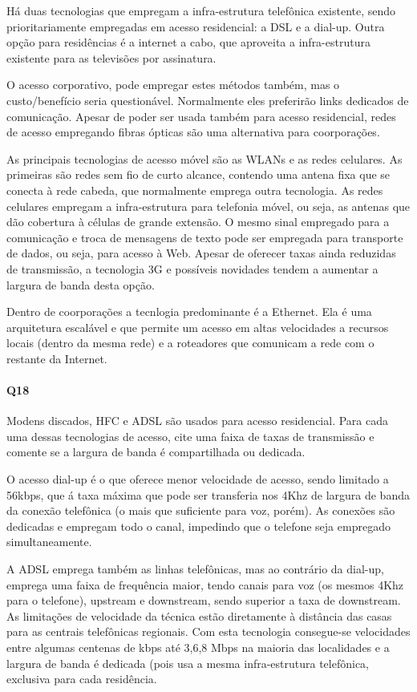 Há duas tecnologias que empregam a infra-estrutura telefônica existente, sendo prioritariamente empregadas em acesso residencial: a DSL e a dial-up.
Outra opção para residências é a internet a cabo, que aproveita a infra-estrutura existente para as televisões por assinatura.

O acesso corporativo, pode empregar estes métodos também, mas o custo/benefício seria questionável.
Normalmente eles preferirão links dedicados de comunicação.
Apesar de poder ser usada também para acesso residencial, redes de acesso empregando fibras ópticas são uma alternativa para coorporações.

As principais tecnologias de acesso móvel são as WLANs e as redes celulares.
As primeiras são redes sem fio de curto alcance, contendo uma antena fixa que se conecta à rede cabeda, que normalmente emprega outra tecnologia.
As redes celulares empregam a infra-estrutura para telefonia móvel, ou seja, as antenas que dão cobertura à células de grande extensão.
O mesmo sinal empregado para a comunicação e troca de mensagens de texto pode ser empregada para transporte de dados, ou seja, para acesso à Web.
Apesar de oferecer taxas ainda reduzidas de transmissão, a tecnologia 3G e possíveis novidades tendem a aumentar a largura de banda desta opção.

Dentro de coorporações a tecnlogia predominante é a Ethernet. Ela é uma arquitetura escalável e que permite um acesso em altas velocidades a recursos locais (dentro da mesma rede) e a roteadores que comunicam a rede com o restante da Internet.


\paragraph{Q18}
Modens discados, HFC e ADSL são usados para acesso residencial. Para cada uma dessas tecnologias de acesso, cite uma faixa de taxas de transmissão e comente se a largura de banda é compartilhada ou dedicada.

O acesso dial-up é o que oferece menor velocidade de acesso, sendo limitado a 56kbps, que á taxa máxima que pode ser transferia nos 4Khz de largura de banda da conexão telefônica (o mais que suficiente para voz, porém).
As conexões são dedicadas e empregam todo o canal, impedindo que o telefone seja empregado simultaneamente.

A ADSL emprega também as linhas telefônicas, mas ao contrário da dial-up, emprega uma faixa de frequência maior, tendo canais para voz (os mesmos 4Khz para o telefone), upstream e downstream, sendo superior a taxa de downstream.
As limitações de velocidade da técnica estão diretamente à distância das casas para as centrais telefônicas regionais. 
Com esta tecnologia consegue-se velocidades entre algumas centenas de kbps até 3,6,8 Mbps na maioria das localidades e a largura de banda é dedicada (pois usa a mesma infra-estrutura telefônica, exclusiva para cada residência.

